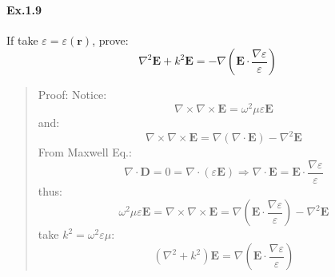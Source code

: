 \documentclass[11pt,a4paper,oneside]{book}
\begin{document}
\paragraph{Ex.1.9} If take $\varepsilon=\varepsilon (\mathbf{r})$, prove:\begin{equation}
	\nabla^2\mathbf{E}+k^2\mathbf{E}=-\nabla\left( \mathbf{E}\cdot\frac{\nabla \varepsilon}{\varepsilon} \right)
\end{equation}
\begin{quotation}
	Proof: Notice:\begin{equation}
		\nabla\times\nabla\times\mathbf{E}=\omega^2\mu\varepsilon \mathbf{E}
	\end{equation}
	and:\begin{equation}
		\nabla\times\nabla\times\mathbf{E}=\nabla(\nabla\cdot\mathbf{E})-\nabla^2\mathbf{E}
	\end{equation}
	From Maxwell Eq.:\begin{equation}
		\nabla\cdot\mathbf{D}=0=\nabla\cdot(\varepsilon\mathbf{E})\Rightarrow\nabla\cdot\mathbf{E}=\mathbf{E}\cdot\frac{\nabla\varepsilon}{\varepsilon}
	\end{equation}thus:\begin{equation}
		\omega^2\mu\varepsilon \mathbf{E}=\nabla\times\nabla\times\mathbf{E}=\nabla\left(\mathbf{E}\cdot\frac{\nabla\varepsilon}{\varepsilon}\right)-\nabla^2\mathbf{E}
	\end{equation}take $k^2=\omega^2\varepsilon\mu$:\begin{equation}
		\left(\nabla^2+k^2\right)\mathbf{E}=\nabla\left(\mathbf{E}\cdot\frac{\nabla\varepsilon}{\varepsilon}\right)
	\end{equation} 
\end{quotation}
\end{document}
